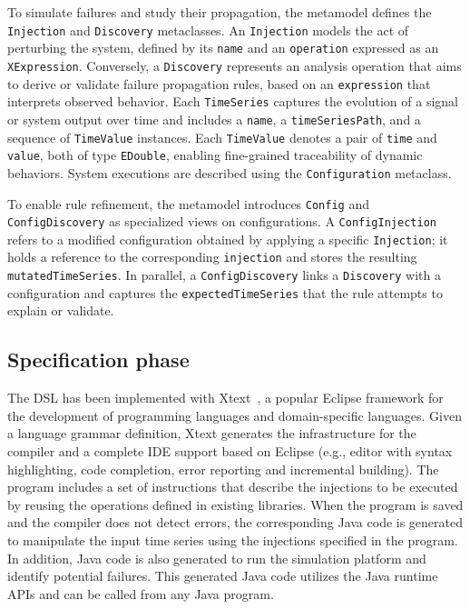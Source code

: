 To simulate failures and study their propagation, the metamodel defines the \texttt{Injection} and \texttt{Discovery} metaclasses. An \texttt{Injection} models the act of perturbing the system, defined by its \texttt{name} and an \texttt{operation} expressed as an \texttt{XExpression}. Conversely, a \texttt{Discovery} represents an analysis operation that aims to derive or validate failure propagation rules, based on an \texttt{expression} that interprets observed behavior.
Each \texttt{TimeSeries} captures the evolution of a signal or system output over time and includes a \texttt{name}, a \texttt{timeSeriesPath}, and a sequence of \texttt{TimeValue} instances. Each \texttt{TimeValue} denotes a pair of \texttt{time} and \texttt{value}, both of type \texttt{EDouble}, enabling fine-grained traceability of dynamic behaviors.
System executions are described using the \texttt{Configuration} metaclass.%

To enable rule refinement, the metamodel introduces \texttt{Config}  and \texttt{ConfigDiscovery} as specialized views on configurations. A \texttt{ConfigInjection} refers to a modified configuration obtained by applying a specific \texttt{Injection}; it holds a reference to the corresponding \texttt{injection} and stores the resulting \texttt{mutatedTimeSeries}. In parallel, a \texttt{ConfigDiscovery} links a \texttt{Discovery} with a configuration and captures the \texttt{expectedTimeSeries} that the rule attempts to explain or validate.





\subsection{Specification phase}
The \tool DSL has been implemented with Xtext~\citep{10.5555/3074444}, a popular Eclipse framework for the development of programming languages and domain-specific languages. Given a language grammar definition, Xtext generates the infrastructure
for the compiler and a complete IDE support based on Eclipse (e.g., editor with syntax highlighting, code completion, error
reporting and incremental building).
The \tool program includes a set of instructions that describe the injections to be executed by reusing the operations defined in existing libraries. When the \tool program is saved and the compiler does not detect errors, the corresponding Java code is generated to manipulate the input time series using the injections specified in the \tool program. In addition, Java code is also generated to run the simulation platform and identify potential failures. This generated Java code utilizes the \tool Java runtime APIs and can be called from any Java program.


